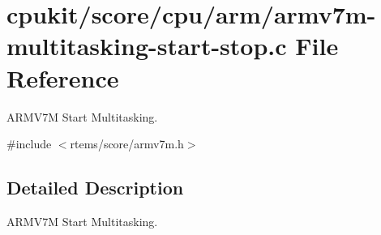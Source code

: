 \hypertarget{armv7m-multitasking-start-stop_8c}{}\section{cpukit/score/cpu/arm/armv7m-\/multitasking-\/start-\/stop.c File Reference}
\label{armv7m-multitasking-start-stop_8c}


A\+R\+M\+V7M Start Multitasking.  


{\ttfamily \#include $<$rtems/score/armv7m.\+h$>$}\newline


\subsection{Detailed Description}
A\+R\+M\+V7M Start Multitasking. 

